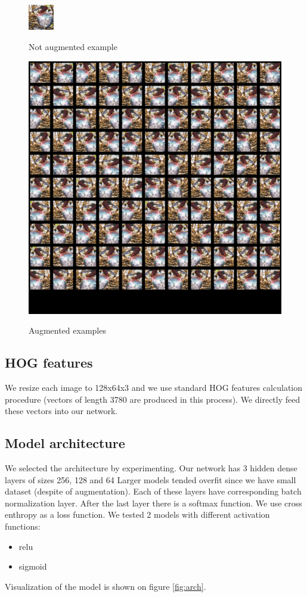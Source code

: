 \documentclass[a4paper]{article}
\begin{document}
\begin{figure}[h]
    \caption[]{Not augmented example}
    \centering
    \includegraphics[page=2,width=0.1\textwidth]{aug1.png}
    \label{fig:aug1}
\end{figure}

\begin{figure}[h]
    \caption[]{Augmented examples}
    \centering
    \includegraphics[page=2,width=1.0\textwidth]{aug2.png}
    \label{fig:aug2}
\end{figure}


\subsection{HOG features}
We resize each image to 128x64x3 and we use
standard HOG features calculation procedure
(vectors of length 3780 are produced in this process).
We directly feed these vectors into our network.

\subsection{Model architecture}
We selected the architecture by experimenting.
Our network has 3 hidden dense layers of sizes 256, 128 and 64
Larger models tended overfit since we have small dataset
(despite of augmentation).
Each of these layers have corresponding batch normalization layer.
After the last layer there is a softmax function.
We use cross enthropy as a loss function.
We tested 2 models with different activation functions:
\begin{itemize}
    \item relu
    \item sigmoid
\end{itemize}
Visualization of the model is shown on figure \ref{fig:arch}.
\end{document}
